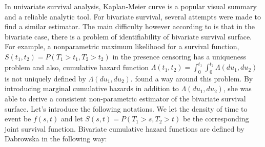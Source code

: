 \documentclass[]{article}
\begin{document}
In univariate survival analysis, Kaplan-Meier curve is a popular visual summary and a reliable analytic tool. For bivariate survival, several attempts were made to find a similar estimator. The main difficulty however according to \cite{kalbfleisch2011statistical} is that in the bivariate case, there is a problem of identifiability of bivariate survival surface. For example, a nonparametric maximum likelihood for a survival function, $S(t_1, t_2) = P(T_1>t_1, T_2>t_2)$ in the presence censoring has a uniqueness problem and also, cumulative hazard function $\Lambda(t_1, t_2) = \int_0^{t_1}\int_0^{t_2}\Lambda(du_1,du_2)$ is not uniquely defined by $\Lambda(du_1,du_2)$.  \cite{dabrowska1988kaplan} found a way around this problem. By introducing marginal cumulative hazards in addition to $\Lambda(du_1,du_2)$, she was able to derive a consistent non-parametric estimator of the bivariate survival surface. Let's introduce the following notations. We let the density of time to event be $f(s,t)$ and let $S(s,t) = P(T_1>s, T_2>t)$ be the corresponding joint survival function. Bivariate cumulative hazard functions are defined by Dabrowska in the following way:
\end{document}
